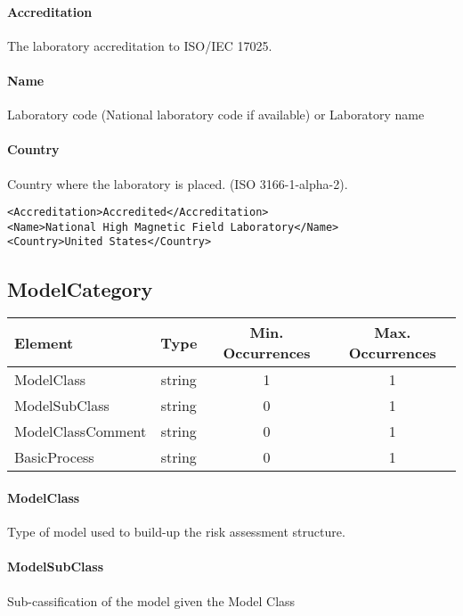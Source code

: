 \documentclass[a4paper]{report}
\begin{document}
\paragraph{Accreditation}
The laboratory accreditation to ISO/IEC 17025.

\paragraph{Name}
Laboratory code (National laboratory code if available) or Laboratory name 

\paragraph{Country}
Country where the laboratory is placed. (ISO 3166-1-alpha-2).

\begin{lstlisting}[language=RAKIP, caption={Example of Laboratory}]
<Accreditation>Accredited</Accreditation>
<Name>National High Magnetic Field Laboratory</Name>
<Country>United States</Country>
\end{lstlisting}   

\subsection{ModelCategory}

\begin{tabular}{|l|c|c|c|}
    \hline
    \textbf{Element} & \textbf{Type} & \textbf{Min. Occurrences} & \textbf{Max. Occurrences} \\
    \hline
    ModelClass & string & 1 & 1 \\
    ModelSubClass & string & 0 & 1 \\
    ModelClassComment & string & 0 & 1 \\
    BasicProcess & string & 0 & 1 \\
    \hline
\end{tabular}

\paragraph{ModelClass}
Type of model used to build-up the risk assessment structure.

\paragraph{ModelSubClass}
Sub-cassification of the model given the Model Class
\end{document}
